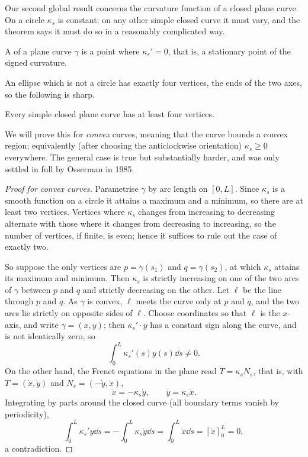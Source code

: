 \documentclass[a4paper]{scrartcl}
\begin{document}
Our second global result concerns the curvature function of a closed plane curve. On a circle $\kappa_s$ is constant; on any other simple closed curve it must vary, and the theorem says it must do so in a reasonably complicated way.

\begin{definition}[Vertex]
    A  of a plane curve $\gamma$ is a point where $\kappa_s' = 0$, that is, a stationary point of the signed curvature.
\end{definition}

An ellipse which is not a circle has exactly four vertices, the ends of the two axes, so the following is sharp.

\begin{theorem}
    Every simple closed plane curve has at least four vertices.
\end{theorem}

We will prove this for \emph{convex} curves, meaning that the curve bounds a convex region; equivalently (after choosing the anticlockwise orientation) $\kappa_s \geq 0$ everywhere. The general case is true but substantially harder, and was only settled in full by Osserman in 1985.

\begin{proof}[Proof for convex curves]
    Parametrise $\gamma$ by arc length on $[0, L]$. Since $\kappa_s$ is a smooth function on a circle it attains a maximum and a minimum, so there are at least two vertices. Vertices where $\kappa_s$ changes from increasing to decreasing alternate with those where it changes from decreasing to increasing, so the number of vertices, if finite, is even; hence it suffices to rule out the case of exactly two.

    So suppose the only vertices are $p = \gamma(s_1)$ and $q = \gamma(s_2)$, at which $\kappa_s$ attains its maximum and minimum. Then $\kappa_s$ is strictly increasing on one of the two arcs of $\gamma$ between $p$ and $q$ and strictly decreasing on the other. Let $\ell$ be the line through $p$ and $q$. As $\gamma$ is convex, $\ell$ meets the curve only at $p$ and $q$, and the two arcs lie strictly on opposite sides of $\ell$. Choose coordinates so that $\ell$ is the $x$-axis, and write $\gamma = (x,y)$; then $\kappa_s' \cdot y$ has a constant sign along the curve, and is not identically zero, so
    $$
    \int_0^L \kappa_s'(s) y(s) \dd s \neq 0.
    $$
    On the other hand, the Frenet equations in the plane read $\dot T = \kappa_s N_s$, that is, with $T = (\dot x, \dot y)$ and $N_s = (-\dot y, \dot x)$,
    $$
    \ddot x = -\kappa_s \dot y, \qquad \ddot y = \kappa_s \dot x.
    $$
    Integrating by parts around the closed curve (all boundary terms vanish by periodicity),
    $$
    \int_0^L \kappa_s' y \dd s = -\int_0^L \kappa_s \dot y \dd s = \int_0^L \ddot x \dd s = \left[\dot x\right]_0^L = 0,
    $$
    a contradiction.
\end{proof}
\end{document}
